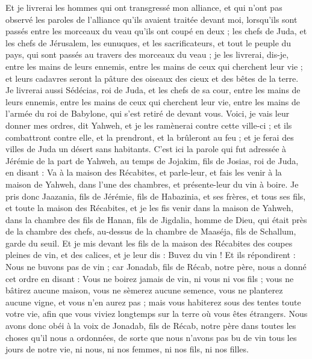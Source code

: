 \begin{multicols}{2}
Et je livrerai les hommes qui ont transgressé mon alliance, et qui n'ont pas observé les paroles de l'alliance qu'ils avaient traitée devant moi, lorsqu'ils sont passés entre les morceaux du veau qu'ils ont coupé en deux ;
les chefs de Juda, et les chefs de Jérusalem, les eunuques, et les sacrificateurs, et tout le peuple du pays, qui sont passés au travers des morceaux du veau ;
je les livrerai, dis-je, entre les mains de leurs ennemis, entre les mains de ceux qui cherchent leur vie ; et leurs cadavres seront la pâture des oiseaux des cieux et des bêtes de la terre.
Je livrerai aussi Sédécias, roi de Juda, et les chefs de sa cour, entre les mains de leurs ennemis, entre les mains de ceux qui cherchent leur vie, entre les mains de l'armée du roi de Babylone, qui s'est retiré de devant vous.
Voici, je vais leur donner mes ordres, dit Yahweh, et je les ramènerai contre cette ville-ci ; et ils combattront contre elle, et la prendront, et la brûleront au feu ; et je ferai des villes de Juda un désert sans habitants.
\VerseOne{}C'est ici la parole qui fut adressée à Jérémie de la part de Yahweh, au temps de Jojakim, fils de Josias, roi de Juda, en disant :
Va à la maison des Récabites, et parle-leur, et fais les venir à la maison de Yahweh, dans l'une des chambres, et présente-leur du vin à boire.
Je pris donc Jaazania, fils de Jérémie, fils de Habazinia, et ses frères, et tous ses fils, et toute la maison des Récabites,
et je les fis venir dans la maison de Yahweh, dans la chambre des fils de Hanan, fils de Jigdalia, homme de Dieu, qui était près de la chambre des chefs, au-dessus de la chambre de Maaséja, fils de Schallum, garde du seuil.
Et je mis devant les fils de la maison des Récabites des coupes pleines de vin, et des calices, et je leur dis : Buvez du vin !
Et ils répondirent : Nous ne buvons pas de vin ; car Jonadab, fils de Récab, notre père, nous a donné cet ordre en disant : Vous ne boirez jamais de vin, ni vous ni vos fils ;
vous ne bâtirez aucune maison, vous ne sèmerez aucune semence, vous ne planterez aucune vigne, et vous n'en aurez pas ; mais vous habiterez sous des tentes toute votre vie, afin que vous viviez longtemps sur la terre où vous êtes étrangers.
Nous avons donc obéi à la voix de Jonadab, fils de Récab, notre père dans toutes les choses qu'il nous a ordonnées, de sorte que nous n'avons pas bu de vin tous les jours de notre vie, ni nous, ni nos femmes, ni nos fils, ni nos filles.

\end{multicols}
